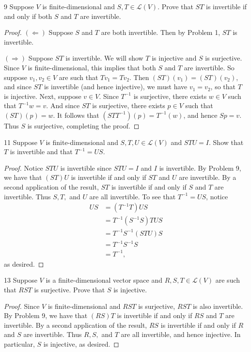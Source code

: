 \documentclass[11pt]{extarticle}
\newenvironment{problem}[1]{\begin{prob*}{#1}{}}{\end{prob*}}
\newcommand{\Hom}{\mathcal{L}}
\begin{document}
\begin{problem}{9}
Suppose $V$ is finite-dimensional and $S,T\in\Hom(V)$.  Prove that $ST$ is invertible if and only if both $S$ and $T$ are invertible.  
\end{problem}
\begin{proof}
$(\Leftarrow)$  Suppose $S$ and $T$ are both invertible.  Then by Problem 1, $ST$ is invertible.
\par $(\Rightarrow)$  Suppose $ST$ is invertible.  We will show $T$ is injective and $S$ is surjective.  Since $V$ is finite-dimensional, this implies that both $S$ and $T$ are invertible.  So suppose $v_1,v_2\in V$ are such that $Tv_1 = Tv_2$.  Then $(ST)(v_1) = (ST)(v_2)$, and since $ST$ is invertible (and hence injective), we must have $v_1 = v_2$, so that $T$ is injective.  Next, suppose $v\in V$.  Since $T^{-1}$ is surjective, there exists $w\in V$ such that $T^{-1}w = v$.  And since $ST$ is surjective, there exists $p\in V$ such that $(ST)(p) = w$.  It follows that $(STT^{-1})(p) = T^{-1}(w)$, and hence $Sp = v$.  Thus $S$ is surjective, completing the proof.
\end{proof}

\begin{problem}{11}
Suppose $V$ is finite-dimensional and $S,T,U\in\Hom(V)$ and $STU = I$.  Show that $T$ is invertible and that $T^{-1}=US$.
\end{problem}
\begin{proof}
Notice $STU$ is invertible since $STU=I$ and $I$ is invertible.  By Problem 9, we have that $(ST)U$ is invertible if and only if $ST$ and $U$ are invertible.  By a second application of the result, $ST$ is invertible if and only if $S$ and $T$ are invertible.  Thus $S,T,$ and $U$ are all invertible.  To see that $T^{-1}=US$, notice
\begin{align*}
US &= (T^{-1}T)US\\
&= T^{-1}(S^{-1}S)TUS\\
&= T^{-1}S^{-1}(STU)S\\
&= T^{-1}S^{-1}S\\
&= T^{-1},
\end{align*}
as desired.
\end{proof}

\begin{problem}{13}
Suppose $V$ is a finite-dimensional vector space and $R,S,T\in\Hom(V)$ are such that $RST$ is surjective.  Prove that $S$ is injective.
\end{problem}
\begin{proof}
Since $V$ is finite-dimensional and $RST$ is surjective, $RST$ is also invertible.  By Problem 9, we have that $(RS)T$ is invertible if and only if $RS$ and $T$ are invertible.  By a second application of the result, $RS$ is invertible if and only if $R$ and $S$ are invertible.  Thus $R,S,$ and $T$ are all invertible, and hence injective.  In particular, $S$ is injective, as desired.
\end{proof}
\end{document}
